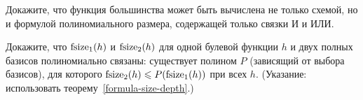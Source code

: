 \begin{problem}
Докажите, что функция большинства может быть вычислена не только
схемой, но и формулой полиномиального размера, содержащей только
связки И и ИЛИ.
\end{problem}

\begin{problem}
Докажите, что $\operatorname{fsize}_1(h)$ и $\operatorname{fsize}_2(h)$ для одной
булевой функ\-ции $h$ и двух полных базисов полиномиально
связаны: существует полином $P$ (зависящий от выбора базисов),
для которого $\operatorname{fsize}_2 (h) \leqslant P(\operatorname{fsize}_1(h))$ при всех $h$.
(Указание: использовать теорему~\ref{formula-size-depth}.)
\end{problem}
